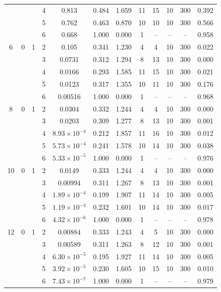\documentclass[12pt]{article}
\begin{document}
\begin{table}
\begin{ruledtabular}
\begin{tabular}{cccccccccccc}
 & &  & 4 & 0.813 & 0.484 & 1.059 & 11 & 15 & 10 & 300 & 0.392 \\
 & &  & 5 & 0.762 & 0.463 & 0.870 & 10 & 10 & 10 & 300 & 0.566 \\
 & &  & 6 & 0.668 & 1.000 & 0.000 & 1 & -- & -- & -- & 0.958 \\
\hline
6 & 0 & 1 & 2 & 0.105 & 0.341 & 1.230 & 4 & 4 & 10 & 300 & 0.022 \\
 & &  & 3 & 0.0731 & 0.312 & 1.294 & 8 & 13 & 10 & 300 & 0.000 \\
 & &  & 4 & 0.0166 & 0.293 & 1.585 & 11 & 15 & 10 & 300 & 0.021 \\
 & &  & 5 & 0.0123 & 0.317 & 1.355 & 10 & 11 & 10 & 300 & 0.176 \\
 & &  & 6 & 0.00516 & 1.000 & 0.000 & 1 & -- & -- & -- & 0.968 \\
\hline
8 & 0 & 1 & 2 & 0.0304 & 0.332 & 1.244 & 4 & 4 & 10 & 300 & 0.000 \\
 & &  & 3 & 0.0203 & 0.309 & 1.277 & 8 & 13 & 10 & 300 & 0.001 \\
 & &  & 4 & $8.93\times10^{-4}$ & 0.212 & 1.857 & 11 & 16 & 10 & 300 & 0.012 \\
 & &  & 5 & $5.73\times10^{-4}$ & 0.241 & 1.578 & 10 & 14 & 10 & 300 & 0.038 \\
 & &  & 6 & $5.33\times10^{-5}$ & 1.000 & 0.000 & 1 & -- & -- & -- & 0.976 \\
\hline
10 & 0 & 1 & 2 & 0.0149 & 0.333 & 1.244 & 4 & 4 & 10 & 300 & 0.000 \\
 & &  & 3 & 0.00994 & 0.311 & 1.267 & 8 & 13 & 10 & 300 & 0.001 \\
 & &  & 4 & $1.89\times10^{-4}$ & 0.199 & 1.907 & 11 & 14 & 10 & 300 & 0.005 \\
 & &  & 5 & $1.19\times10^{-4}$ & 0.232 & 1.601 & 10 & 14 & 10 & 300 & 0.017 \\
 & &  & 6 & $4.32\times10^{-6}$ & 1.000 & 0.000 & 1 & -- & -- & -- & 0.978 \\
\hline
12 & 0 & 1 & 2 & 0.00884 & 0.333 & 1.243 & 4 & 5 & 10 & 300 & 0.000 \\
 & &  & 3 & 0.00589 & 0.311 & 1.263 & 8 & 12 & 10 & 300 & 0.001 \\
 & &  & 4 & $6.30\times10^{-5}$ & 0.195 & 1.927 & 11 & 14 & 10 & 300 & 0.005 \\
 & &  & 5 & $3.92\times10^{-5}$ & 0.230 & 1.605 & 10 & 15 & 10 & 300 & 0.010 \\
 & &  & 6 & $7.43\times10^{-7}$ & 1.000 & 0.000 & 1 & -- & -- & -- & 0.979
\end{tabular}
\end{ruledtabular}
\end{table}
\end{document}
